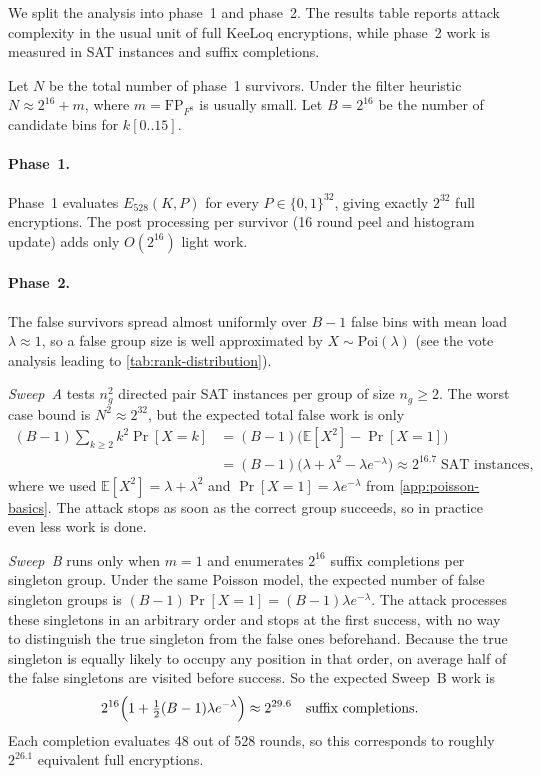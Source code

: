 \documentclass[version=preprint]{iacrcc}
\begin{document}
We split the analysis into phase~1 and phase~2.
The results table reports attack complexity in the usual unit of full KeeLoq encryptions, while phase~2 work is measured in SAT instances and suffix completions.

Let $N$ be the total number of phase~1 survivors.
Under the filter heuristic $N \approx 2^{16} + m$, where $m = \mathrm{FP}_{F^8}$ is usually small.
Let $B = 2^{16}$ be the number of candidate bins for $k[0..15]$.

\paragraph{Phase~1.}
Phase~1 evaluates $E_{528}(K,P)$ for every $P \in \{0,1\}^{32}$, giving exactly $2^{32}$ full encryptions.
The post processing per survivor (16 round peel and histogram update) adds only $O(2^{16})$ light work.

\paragraph{Phase~2.}
The false survivors spread almost uniformly over $B - 1$ false bins with mean load $\lambda \approx 1$, so a false group size is well approximated by $X \sim \mathrm{Poi}(\lambda)$ (see the vote analysis leading to \autoref{tab:rank-distribution}).

\emph{Sweep~A} tests $n_g^2$ directed pair SAT instances per group of size $n_g \geq 2$.
The worst case bound is $N^2 \approx 2^{32}$, but the expected total false work is only
\begin{align*}
(B-1)\sum_{k \geq 2} k^2\Pr[X{=}k]
&= (B-1)\bigl(\mathbb{E}[X^2] - \Pr[X{=}1]\bigr) \\
&= (B-1)\bigl(\lambda + \lambda^2 - \lambda e^{-\lambda}\bigr)
\approx 2^{16.7} \;\text{SAT instances},
\end{align*}
where we used $\mathbb{E}[X^2] = \lambda + \lambda^2$ and $\Pr[X{=}1] = \lambda e^{-\lambda}$ from \autoref{app:poisson-basics}.
The attack stops as soon as the correct group succeeds, so in practice even less work is done.

\emph{Sweep~B} runs only when $m = 1$ and enumerates $2^{16}$ suffix completions per singleton group.
Under the same Poisson model, the expected number of false singleton groups is $(B-1)\Pr[X{=}1] = (B-1)\lambda e^{-\lambda}$.
The attack processes these singletons in an arbitrary order and stops at the first success, with no way to distinguish the true singleton from the false ones beforehand.
Because the true singleton is equally likely to occupy any position in that order, on average half of the false singletons are visited before success.
So the expected Sweep~B work is
\[
2^{16}\Bigl(1 + \tfrac{1}{2}(B-1)\lambda e^{-\lambda}\Bigr) \approx 2^{29.6} \quad \text{suffix completions}.
\]
Each completion evaluates 48 out of 528 rounds, so this corresponds to roughly $2^{26.1}$ equivalent full encryptions.
\end{document}
